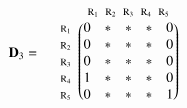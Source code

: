 \documentclass[a4paper,10pt]{article}
\begin{document}
\begin{equation*}
\mathbf{D}_3 = \; \; \; \; \; \begin{matrix}
 & 

\begin{matrix}
\text{\scriptsize $\mathrm{R}_1$} \!\!\! & 
\text{\scriptsize $\mathrm{R}_2$} \!\!\! & 
\text{\scriptsize $\mathrm{R}_3$} \!\!\! & 
\text{\scriptsize $\mathrm{R}_4$} \!\!\! & 
\text{\scriptsize $\mathrm{R}_5$}
\end{matrix}

\\ 

\begin{matrix*}[l]
\text{\scriptsize $\mathrm{R}_1$} \!\!\! \\
\text{\scriptsize $\mathrm{R}_2$} \!\!\! \\
\text{\scriptsize $\mathrm{R}_3$} \!\!\! \\
\text{\scriptsize $\mathrm{R}_4$} \!\!\! \\
\text{\scriptsize $\mathrm{R}_5$} \!\!\!
\end{matrix*}

& 

\begin{pmatrix}
0 & * & * & * & 0 \\
0 & * & * & * & 0 \\
0 & * & * & * & 0 \\
1 & * & * & * & 0 \\
0 & * & * & * & 1
\end{pmatrix}

\end{matrix}
\end{equation*}

\bigskip
\end{document}

